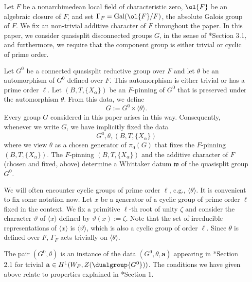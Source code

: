\documentclass[11pt,letterpaper]{amsart}
\numberwithin{equation}{section}
\begin{document}
Let $F$ be a nonarchimedean local field of characteristic zero, $\ol{F}$ be an algebraic closure of $F$, and set $\Gamma_F=\mathrm{Gal}(\ol{F}/F)$, the absolute Galois group of $F$. We fix an non-trivial additive character of $F$ throughout the paper.
In this paper, we consider quasisplit disconnected groups $G$, in the sense of \cite{Kal26}*{Section 3.1}, and furthermore, we require that the component group is either trivial or cyclic of prime order. 



\begin{definition}\label{assu: groups we consider}
Let $G^0$ be a connected quasisplit reductive group over \(F\) and let \(\theta\) be an automorphism of \(G^0\) defined over \(F\). This automorphism is either trivial or has a prime order \(\ell\).
Let \((B,T,\{X_{\alpha}\})\) be an \(F\)-pinning of \(G^0\) that is preserved under the automorphism \(\theta\).
From this data, we define \[G := G^0 \rtimes \langle \theta \rangle.\] Every group \(G\) considered in this paper arises in this way. Consequently, whenever we write \(G\), we have implicitly fixed the data
\[
G^0, \theta, (B,T,\{X_{\alpha}\})
\]
where we view \(\theta\) as a chosen generator of \(\pi_0(G)\) that fixes the \(F\)-pinning \((B,T,\{X_{\alpha}\})\). The $F$-pinning \((B,T,\{X_{\alpha}\})\) and the additive character of $F$ (chosen and fixed, above) determine a Whittaker datum $\mathfrak{w}$ of the quasisplit group $G^0$.
\end{definition}




We will often encounter cyclic groups of prime order $\ell$, e.g., $\langle\theta\rangle$. It is convenient to fix some notation now. Let $x$ be a generator of a cyclic group of prime order $\ell$ fixed in the context. We fix a primitive $\ell$-th root of unity $\zeta$ and consider the character $\vartheta$ of $\langle x\rangle$ defined by $\vartheta(x):=\zeta.$ Note that the set of irreducible representations of $\langle x \rangle$ is $\langle\vartheta\rangle$, which is also a cyclic group of order $\ell.$
Since $\theta$ is defined over $F$,  $\Gamma_F$ acts trivially on $\langle\theta\rangle$.


\begin{remark}\label{remark: trivial a}
The pair $(G^0,\theta)$ is an instance of the data $(G^0,\theta,\mathbf{a})$ appearing in \cite{KS99}*{Section 2.1} for trivial $\mathbf{a} \in H^1(W_F,Z(\dualgroup{G^0}))$. 
The conditions we have given above relate to properties explained in \cite{KS99}*{Section 1}. 
\end{remark}
\end{document}
